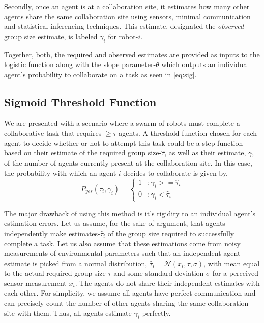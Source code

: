 \documentclass[conference]{ieeeconf}
\def\estt{\hat{\tau}}
\def\estg{\gamma}
\begin{document}
Secondly, once an agent is at a collaboration site, it estimates how many other agents share the same collaboration site using sensors, minimal communication and statistical inferencing techniques. This estimate, designated the \emph{observed} group size estimate, is labeled $\estg_i$ for robot-$i$.

Together, both, the required and observed estimates are provided as inputs to the logistic function along with the slope parameter-$\theta$ which outputs an individual agent's probability to collaborate on a task as seen in \eqref{eq:sig}.

\subsection{Sigmoid Threshold Function}\label{sec:sig}
We are presented with a scenario where a swarm of robots must complete a collaborative task that requires $\geq \tau$ agents. A threshold function chosen for each agent to decide whether or not to attempt this task could be a step-function based on their estimate of the required group size-$\estt$, as well as their estimate, $\estg$, of the number of agents currently present at the collaboration site. In this case, the probability with which an agent-$i$ decides to collaborate is given by, 
\begin{equation}\label{eq:step}
	P_{yes}(\estt_i,\estg_i) = \left\{
	\begin{array}{ll}
		1 & : \estg_i >= \estt_i\\ 
		0 & : \estg_i < \estt_i
	\end{array}\right.
\end{equation}

The major drawback of using this method is it's rigidity to an individual agent's estimation errors. Let us assume, for the sake of argument, that agents independently make estimates-$\estt_i$ of the group size required to successfully complete a task. Let us also assume that these estimations come from noisy measurements of environmental parameters such that an independent agent estimate is picked from a normal distribution, $\estt_i = \mathcal{N}(x_i, \tau, \sigma)$, with mean equal to the actual required group size-$\tau$ and some standard deviation-$\sigma$ for a perceived sensor measurement-$x_i$. The agents do not share their independent estimates with each other. For simplicity, we assume all agents have perfect communication and can precisely count the number of other agents sharing the same collaboration site with them. Thus, all agents estimate $\estg_i$ perfectly.
\end{document}
